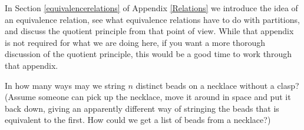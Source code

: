 In Section \ref{equivalencerelations} of Appendix \ref{Relations} we
introduce the idea of an equivalence relation, see what equivalence relations
have to do with partitions, and discuss the quotient principle from that
point of view.  While that appendix is not required for what we are doing
here, if you want a more thorough discussion of the quotient principle, this
would be a good time to work through that appendix.

\bp
\itemei In how many ways may we string $n$ distinct beads on a necklace
without a clasp? (Assume someone can pick up the necklace,
move it around in space and put it back down, giving an
apparently different way of stringing the beads that is
equivalent to the first.  How could we get a list of beads
from a necklace?)\label{necklace}


